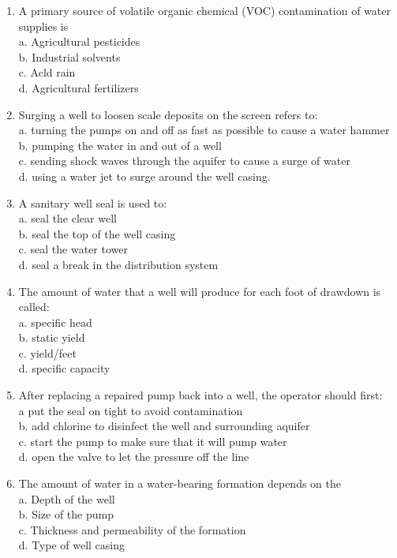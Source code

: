 \begin{enumerate}
\item A primary source of volatile organic chemical (VOC) contamination of water supplies is\\
a. Agricultural pesticides\\
b. Industrial solvents\\
c. Acld rain\\
d. Agricultural fertilizers\\

\item Surging a well to loosen scale deposits on the screen refers to:\\
a. turning the pumps on and off as fast as possible to cause a water hammer\\
b. pumping the water in and out of a well\\
c. sending shock waves through the aquifer to cause a surge of water\\
d. using a water jet to surge around the well casing.\\

\item A sanitary well seal is used to:\\
a. seal the clear well\\
b. seal the top of the well casing\\
c. seal the water tower\\
d. seal a break in the distribution system

\item The amount of water that a well will produce for each foot of drawdown is called:\\
a. specific head\\
b. static yield\\
c. yield/feet\\
d. specific capacity\\

\item After replacing a repaired pump back into a well, the operator should first:\\
a put the seal on tight to avoid contamination\\
b. add chlorine to disinfect the well and surrounding aquifer\\
c. start the pump to make sure that it will pump water\\
d. open the valve to let the pressure off the line \\


\item The amount of water in a water-bearing formation depends on the\\
a. Depth of the well\\
b. Size of the pump\\
c. Thickness and permeability of the formation\\
d. Type of well casing\\ 


\end{enumerate}
